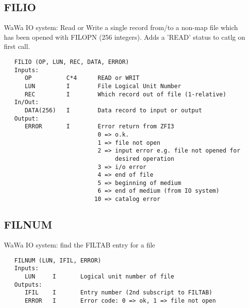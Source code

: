 \subsection{FILIO}
WaWa IO system:  Read or Write a single record from/to a non-map
file which has been opened with FILOPN (256 integers).  Adds a
'READ' status to catlg on first call.
\begin{verbatim}
   FILIO (OP, LUN, REC, DATA, ERROR)
   Inputs:
      OP          C*4      READ or WRIT
      LUN         I        File Logical Unit Number
      REC         I        Which record out of file (1-relative)
   In/Out:
      DATA(256)   I        Data record to input or output
   Output:
      ERROR       I        Error return from ZFI3
                           0 => o.k.
                           1 => file not open
                           2 => input error e.g. file not opened for
                                desired operation
                           3 => i/o error
                           4 => end of file
                           5 => beginning of medium
                           6 => end of medium (from IO system)
                          10 => catalog error

\end{verbatim}

\subsection{FILNUM}
WaWa IO system: find the FILTAB entry for a file
\begin{verbatim}
   FILNUM (LUN, IFIL, ERROR)
   Inputs:
      LUN     I       Logical unit number of file
   Outputs:
      IFIL    I       Entry number (2nd subscript to FILTAB)
      ERROR   I       Error code: 0 => ok, 1 => file not open

\end{verbatim}

